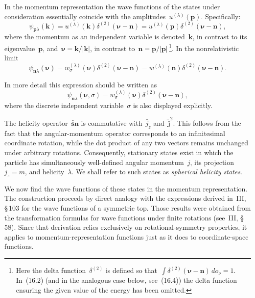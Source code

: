 In the momentum representation the wave functions of the states under consideration essentially coincide with the amplitudes~$u^{(\lambda)}(\mathbf{p})$. Specifically:
\begin{equation}
\psi_{\mathbf{p}\lambda}(\mathbf{k}) = u^{(\lambda)}(\mathbf{k})\delta^{(2)}(\boldsymbol{\nu} - \mathbf{n}) = u^{(\lambda)}(\mathbf{p})\delta^{(2)}(\boldsymbol{\nu} - \mathbf{n}),
\tag{16.2}
\end{equation}
where the momentum as an independent variable is denoted~$\mathbf{k}$, in contrast to its eigenvalue~$\mathbf{p}$, and~$\boldsymbol{\nu} = \mathbf{k}/|\mathbf{k}|$, in contrast to~$\mathbf{n} = \mathbf{p}/|\mathbf{p}|$\,\footnote{Here the delta function~$\delta^{(2)}$ is defined so that~$\int\delta^{(2)}(\boldsymbol{\nu} - \mathbf{n})\,do_\nu = 1$. In~(16.2) (and in the analogous case below, see~(16.4)) the delta function ensuring the given value of the energy has been omitted.}. In the nonrelativistic limit
\begin{equation}
\psi_{\mathbf{n}\lambda}(\boldsymbol{\nu}) = w^{(\lambda)}_\sigma(\boldsymbol{\nu})\delta^{(2)}(\boldsymbol{\nu} - \mathbf{n}) = w^{(\lambda)}(\mathbf{n})\delta^{(2)}(\boldsymbol{\nu} - \mathbf{n}).
\tag{16.3}
\end{equation}

In more detail this expression should be written as
\[
\psi_{\mathbf{n}\lambda}(\boldsymbol{\nu}, \sigma) = w^{(\lambda)}_\sigma(\boldsymbol{\nu})\delta^{(2)}(\boldsymbol{\nu} - \mathbf{n}),
\]
where the discrete independent variable~$\sigma$ is also displayed explicitly.

The helicity operator~$\hat{\mathbf{s}}\mathbf{n}$ is commutative with~$\hat{j}_z$ and~$\hat{\mathbf{j}}^2$. This follows from the fact that the angular-momentum operator corresponds to an infinitesimal coordinate rotation, while the dot product of any two vectors remains unchanged under arbitrary rotations. Consequently, stationary states exist in which the particle has simultaneously well-defined angular momentum~$j$, its projection~$j_z = m$, and helicity~$\lambda$. We shall refer to such states as \emph{spherical helicity states}.

We now find the wave functions of these states in the momentum representation. The construction proceeds by direct analogy with the expressions derived in~III, \S\,103 for the wave functions of a symmetric top. Those results were obtained from the transformation formulas for wave functions under finite rotations (see~III, \S\,58). Since that derivation relies exclusively on rotational-symmetry properties, it applies to momentum-representation functions just as it does to coordinate-space functions.

